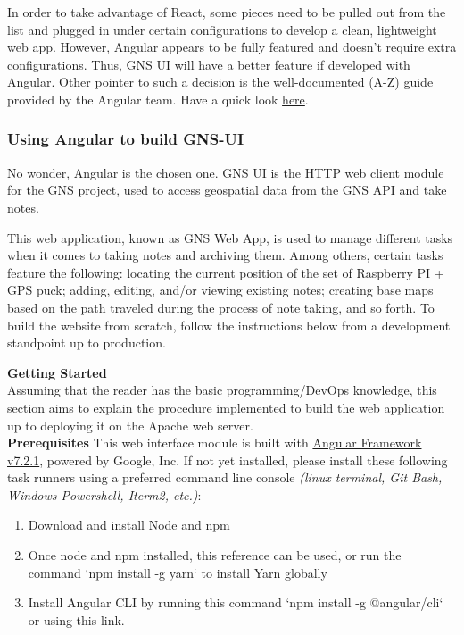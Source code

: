 In order to take advantage of React, some pieces need to be pulled out from the list and plugged in under certain configurations to develop a clean, lightweight web app. However, Angular appears to be fully featured and doesn’t require extra configurations. Thus, GNS UI will have a better feature if developed with Angular. Other pointer to such a decision is the well-documented (A-Z) guide provided by the Angular team. Have a quick look \href{https://angular.io/docs}{here}.

\vspace{1.0cm}
\noindent
\subsubsection{Using Angular to build GNS-UI}
No wonder, Angular is the chosen one. GNS UI is the HTTP web client module for the GNS project, used to access geospatial data from the GNS API and take notes.

This web application, known as GNS Web App, is used to manage different tasks when it comes to taking notes and archiving them. Among others, certain tasks feature the following: locating the current position of the set of Raspberry PI + GPS puck; adding, editing, and/or viewing existing notes; creating base maps based on the path traveled during the process of note taking, and so forth. To build the website from scratch, follow the instructions below from a development standpoint up to production.

\vspace{1.0cm}
\noindent
\textbf{Getting Started}\\
Assuming that the reader has the basic programming/DevOps knowledge, this section aims to explain the procedure implemented to build the web application up to deploying it on the Apache web server.\\

\noindent
\textbf{Prerequisites}
This web interface module is built with \href{https://angular.io}{Angular Framework v7.2.1}, powered by Google, Inc. If not yet installed, please install these following task runners using a preferred command line console \textit{(linux terminal, Git Bash, Windows Powershell, Iterm2, etc.)}:

\begin{enumerate}
    \item Download and install Node and npm
    \item Once node and npm installed, this reference can be used, or run the command `npm install -g yarn` to install Yarn globally
    \item Install Angular CLI by running this command `npm install -g @angular/cli` or using this link.
\end{enumerate}

